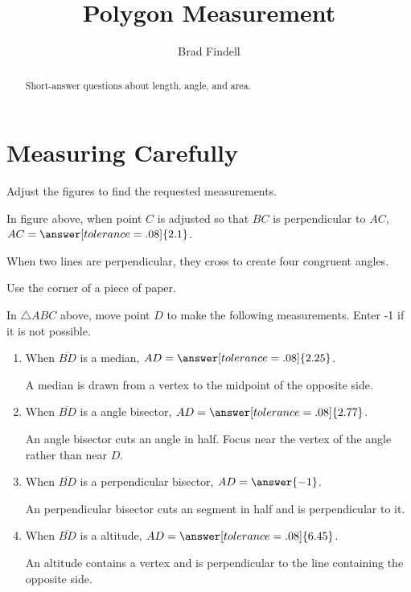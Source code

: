 \documentclass[nooutcomes]{ximera}
\title{Polygon Measurement}
\author{Brad Findell}
\begin{document}
\begin{abstract}
Short-answer questions about length, angle, and area. 
\end{abstract}
\maketitle

\section{Measuring Carefully}
Adjust the figures to find the requested measurements.  

\begin{center}  
\end{center}
\begin{problem}
In figure above, when point $C$ is adjusted so that $BC$ is perpendicular to $AC$, $AC=\answer[tolerance=.08]{2.1}$.
\begin{hint}
When two lines are perpendicular, they cross to create four congruent angles. 
\end{hint}
\begin{hint}
Use the corner of a piece of paper.
\end{hint}
\end{problem}


\begin{center}  
\end{center}
\begin{problem}
In $\triangle ABC$ above, move point $D$ to make the following measurements.  Enter -1 if it is not possible.   
\begin{enumerate}
\item When $\overline{BD}$ is a median, $AD=\answer[tolerance=.08]{2.25}$.
\begin{hint}
A median is drawn from a vertex to the midpoint of the opposite side.
\end{hint}
\item When $\overline{BD}$ is a angle bisector, $AD=\answer[tolerance=.08]{2.77}$.
\begin{hint}
An angle bisector cuts an angle in half.  Focus near the vertex of the angle rather than near $D$.
\end{hint}
\item When $\overline{BD}$ is a perpendicular bisector, $AD=\answer{-1}$.
\begin{hint}
An perpendicular bisector cuts an segment in half and is perpendicular to it.  
\end{hint}
\item When $\overline{BD}$ is a altitude, $AD=\answer[tolerance=.08]{6.45}$.
\begin{hint}
An altitude contains a vertex and is perpendicular to the line containing the opposite side.
\end{hint}
\end{enumerate}
\end{problem}
\end{document}
